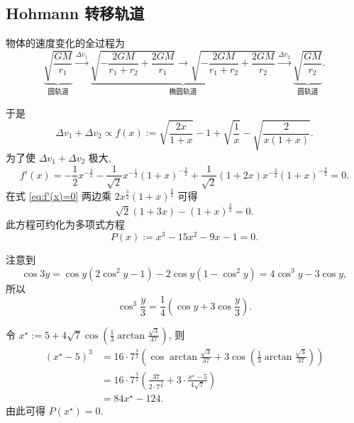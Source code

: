 \documentclass{article}
\begin{document}
\subsection{Hohmann 转移轨道}

物体的速度变化的全过程为
\begin{equation}
	\underbrace{\sqrt{\frac{GM}{r_1}}}_{\text{圆轨道}}\xrightarrow{\Delta v_1}
	\underbrace{\sqrt{-\frac{2GM}{r_1+r_2}+\frac{2GM}{r_1}}
	\rightarrow\sqrt{-\frac{2GM}{r_1+r_2}+\frac{2GM}{r_2}}}_{\text{椭圆轨道}}
	\xrightarrow{\Delta v_2}\underbrace{\sqrt{\frac{GM}{r_2}}}_{\text{圆轨道}}.
\end{equation}

于是
\begin{equation}
	\Delta v_1+\Delta v_2\propto f\!\left(x\right):=\sqrt{\frac{2x}{1+x}}-1+\sqrt{\frac1x}-\sqrt{\frac2{x\left(1+x\right)}}.
\end{equation}
为了使 $\Delta v_1+\Delta v_2$ 极大,
\begin{equation}
	f'\!\left(x\right)=-\frac12x^{-\frac32}-\frac1{\sqrt2}x^{-\frac12}\left(1+x\right)^{-\frac32}+\frac1{\sqrt2}\left(1+2x\right)x^{-\frac32}\left(1+x\right)^{-\frac32}=0.
	\label{eq:f'(x)=0}
\end{equation}
在式 \ref{eq:f'(x)=0} 两边乘 $2x^{\frac32}\left(1+x\right)^{\frac32}$ 可得
\begin{equation}
	\sqrt2\left(1+3x\right)-\left(1+x\right)^{\frac32}=0.
\end{equation}
此方程可约化为多项式方程
\begin{equation}
	P\!\left(x\right):=x^3-15x^2-9x-1=0.
\end{equation}

注意到
\begin{equation*}
	\cos3y=\cos y\left(2\cos^2y-1\right)-2\cos y\left(1-\cos^2y\right)=4\cos^3y-3\cos y,
\end{equation*}
所以
\begin{equation*}
	\cos^3\frac y3=\frac14\left(\cos y+3\cos\frac y3\right).
\end{equation*}

令 $x^\star:=5+4\sqrt7\cos\!\left(\frac13\arctan\frac{\sqrt3}{37}\right)$, 则
\begin{align}
	\left(x^\star-5\right)^3&=16\cdot 7^{\frac 32}\left(\cos\arctan\frac{\sqrt3}{37}+3\cos\!\left(\frac13\arctan\frac{\sqrt3}{37}\right)\right)\\
	&=16\cdot 7^{\frac 32}\left(\frac{37}{2\cdot 7^{\frac32}}+3\cdot\frac{x^\star-5}{4\sqrt7}\right)\\
	&=84x^\star-124.
\end{align}
由此可得 $P\!\left(x^\star\right)=0$.
\end{document}
